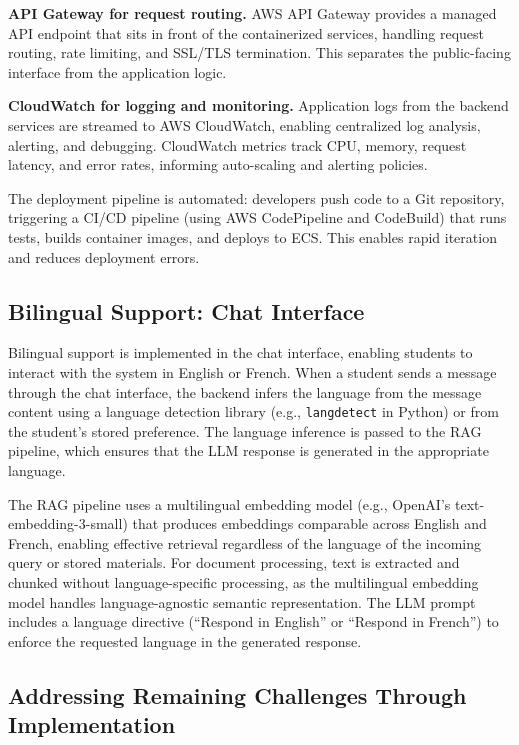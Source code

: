 \documentclass[a4paper,9pt,twocolumn]{extarticle}
\begin{document}
\textbf{API Gateway for request routing.} AWS API Gateway provides a managed API endpoint that sits in front of the containerized services, handling request routing, rate limiting, and SSL/TLS termination. This separates the public-facing interface from the application logic.

\textbf{CloudWatch for logging and monitoring.} Application logs from the backend services are streamed to AWS CloudWatch, enabling centralized log analysis, alerting, and debugging. CloudWatch metrics track CPU, memory, request latency, and error rates, informing auto-scaling and alerting policies.

The deployment pipeline is automated: developers push code to a Git repository, triggering a CI/CD pipeline (using AWS CodePipeline and CodeBuild) that runs tests, builds container images, and deploys to ECS. This enables rapid iteration and reduces deployment errors.

\subsection{Bilingual Support: Chat Interface}
\label{sec:impl:bilingual}

Bilingual support is implemented in the chat interface, enabling students to interact with the system in English or French. When a student sends a message through the chat interface, the backend infers the language from the message content using a language detection library (e.g., \texttt{langdetect} in Python) or from the student's stored preference. The language inference is passed to the RAG pipeline, which ensures that the LLM response is generated in the appropriate language.

The RAG pipeline uses a multilingual embedding model (e.g., OpenAI's text-embedding-3-small) that produces embeddings comparable across English and French, enabling effective retrieval regardless of the language of the incoming query or stored materials. For document processing, text is extracted and chunked without language-specific processing, as the multilingual embedding model handles language-agnostic semantic representation. The LLM prompt includes a language directive (``Respond in English'' or ``Respond in French'') to enforce the requested language in the generated response.

\subsection{Addressing Remaining Challenges Through Implementation}
\label{sec:impl:challenges}
\end{document}
